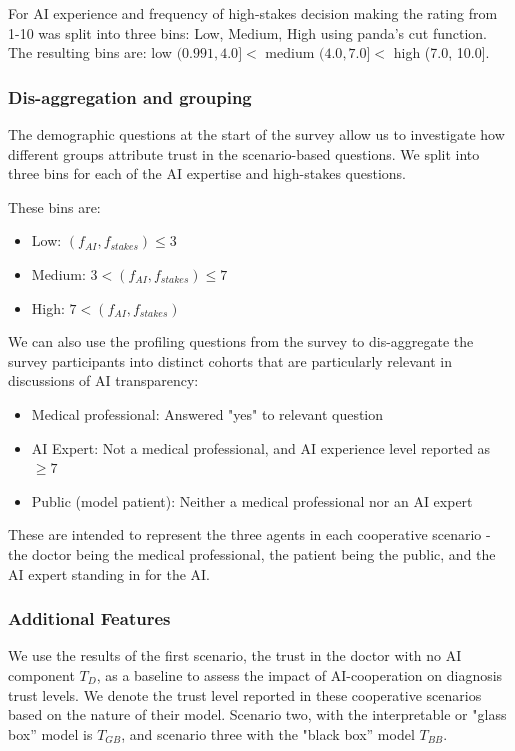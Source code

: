 \documentclass[manuscript,screen,review]{acmart}
\begin{document}
For AI experience and frequency of high-stakes decision making the rating from 1-10 was split into three bins: Low, Medium, High using panda's cut function\cite{mckinney-proc-scipy-2010}. The resulting bins are: low $(0.991, 4.0] <$ medium $(4.0, 7.0] <$ high (7.0, 10.0].

\subsubsection{Dis-aggregation and grouping}

The demographic questions at the start of the survey allow us to investigate how different groups attribute trust in the scenario-based questions. We split into three bins for each of the AI expertise and high-stakes questions. 

These bins are:

\begin{itemize}
    \item Low: $(f_{AI}, f_{stakes}) \leq 3$
    \item Medium: $3 < (f_{AI}, f_{stakes}) \leq 7$
    \item High: $7 < (f_{AI}, f_{stakes})$
\end{itemize}
We can also use the profiling questions from the survey to dis-aggregate the survey participants into distinct cohorts that are particularly relevant in discussions of AI transparency: 

\begin{itemize}
    \item Medical professional: Answered "yes" to relevant question
    \item AI Expert: Not a medical professional, and AI experience level reported as $\geq 7$
    \item Public (model patient): Neither a medical professional nor an AI expert
\end{itemize}

These are intended to represent the three agents in each cooperative scenario - the doctor being the medical professional, the patient being the public, and the AI expert standing in for the AI.

\subsubsection{Additional Features}

We use the results of the first scenario, the trust in the doctor with no AI component $T_D$, as a baseline to assess the impact of AI-cooperation on diagnosis trust levels. We denote the trust level reported in these cooperative scenarios based on the nature of their model. Scenario two, with the interpretable or "glass box'' model is $T_{GB}$, and scenario three with the "black box'' model $T_{BB}$.
\end{document}

